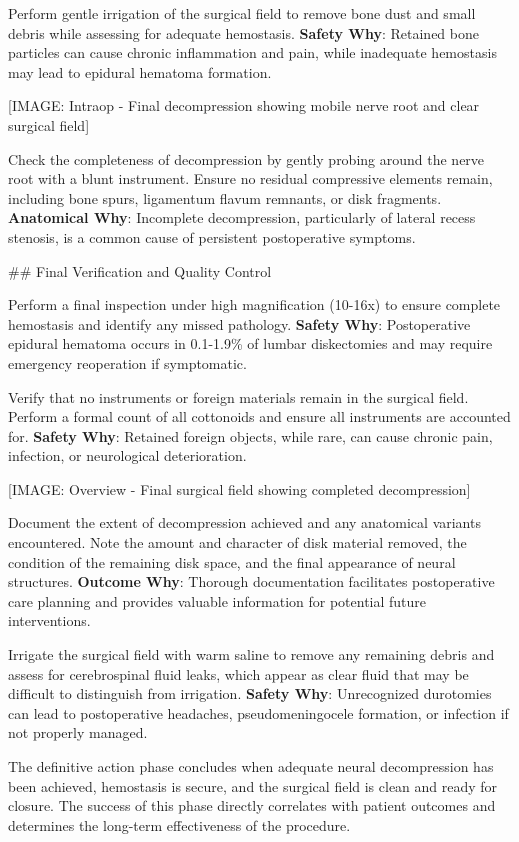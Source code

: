 \documentclass[12pt,a4paper]{article}
\begin{document}
Perform gentle irrigation of the surgical field to remove bone dust and small debris while assessing for adequate hemostasis. \textbf{Safety Why}: Retained bone particles can cause chronic inflammation and pain, while inadequate hemostasis may lead to epidural hematoma formation.

[IMAGE: Intraop - Final decompression showing mobile nerve root and clear surgical field]

Check the completeness of decompression by gently probing around the nerve root with a blunt instrument. Ensure no residual compressive elements remain, including bone spurs, ligamentum flavum remnants, or disk fragments. \textbf{Anatomical Why}: Incomplete decompression, particularly of lateral recess stenosis, is a common cause of persistent postoperative symptoms.

\#\# Final Verification and Quality Control

Perform a final inspection under high magnification (10-16x) to ensure complete hemostasis and identify any missed pathology. \textbf{Safety Why}: Postoperative epidural hematoma occurs in 0.1-1.9\% of lumbar diskectomies and may require emergency reoperation if symptomatic.

Verify that no instruments or foreign materials remain in the surgical field. Perform a formal count of all cottonoids and ensure all instruments are accounted for. \textbf{Safety Why}: Retained foreign objects, while rare, can cause chronic pain, infection, or neurological deterioration.

[IMAGE: Overview - Final surgical field showing completed decompression]

Document the extent of decompression achieved and any anatomical variants encountered. Note the amount and character of disk material removed, the condition of the remaining disk space, and the final appearance of neural structures. \textbf{Outcome Why}: Thorough documentation facilitates postoperative care planning and provides valuable information for potential future interventions.

Irrigate the surgical field with warm saline to remove any remaining debris and assess for cerebrospinal fluid leaks, which appear as clear fluid that may be difficult to distinguish from irrigation. \textbf{Safety Why}: Unrecognized durotomies can lead to postoperative headaches, pseudomeningocele formation, or infection if not properly managed.

The definitive action phase concludes when adequate neural decompression has been achieved, hemostasis is secure, and the surgical field is clean and ready for closure. The success of this phase directly correlates with patient outcomes and determines the long-term effectiveness of the procedure.
\end{document}
